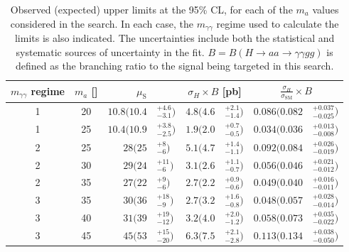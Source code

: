 \begin{table}[t]
  \begin{center}
    \caption{Observed (expected) upper limits at the 95\% CL, for each of the $m_a$ values considered in the search.
      In each case, the $m_{\gamma\gamma}$ regime used to calculate the limits is also indicated.
      The uncertainties include both the statistical and systematic sources of uncertainty in the fit.
      $B=B(H\to aa \to \gamma\gamma gg)$ is defined as the branching ratio to the signal being targeted in this search.
    }
    \label{tab:HBSM:limits}
          {\footnotesize
            \bgroup
            \def\arraystretch{1.5}
            \begin{tabular}{ccr@{}lr@{}lr@{}l}
	    \hline
            $m_{\gamma\gamma}$ regime & $m_a$ [\GeV{}] & \multicolumn{2}{c}{$\mu_\text{S}$}   & \multicolumn{2}{c}{\hspace{1.005cm}$\sigma_H\times B$ [pb]}  & \multicolumn{2}{c}{$\frac{\sigma_H}{\sigma_\text{SM}}\times B$} \\
	    \hline
            1 & 20 & $10.8\Big(10.4$&$^{+4.6}_{-3.1}\Big)$   & \hspace{1.1cm}$4.8\Big(4.6$&$^{+2.1}_{-1.4}\Big)$  & \hspace{0.505cm}$0.086\Big(0.082$&$^{+0.037}_{-0.025}\Big)$ \\
            1 & 25 & $10.4\Big(10.9$&$^{+3.8}_{-2.5}\Big)$   & $1.9\Big(2.0$&$^{+0.7}_{-0.5}\Big)$  & $0.034\Big(0.036$&$^{+0.013}_{-0.008}\Big)$ \\
            2 & 25 & $28\Big(25$&$^{+8}_{-6}\Big)$   & $5.1\Big(4.7$&$^{+1.4}_{-1.1}\Big)$  & $0.092\Big(0.084$&$^{+0.026}_{-0.019}\Big)$ \\
            2 & 30 & $29\Big(24$&$^{+11}_{-6}\Big)$  & $3.1\Big(2.6$&$^{+1.1}_{-0.7}\Big)$ & $0.056\Big(0.046$&$^{+0.021}_{-0.012}\Big)$ \\
            2 & 35 & $27\Big(22$&$^{+9}_{-6}\Big)$   & $2.7\Big(2.2$&$^{+0.9}_{-0.6}\Big)$ & $0.049\Big(0.040$&$^{+0.016}_{-0.011}\Big)$  \\
            3 & 35 & $30\Big(36$&$^{+18}_{-9}\Big)$  & $2.7\Big(3.2$&$^{+1.6}_{-0.8}\Big)$ & $0.048\Big(0.057$&$^{+0.028}_{-0.014}\Big)$  \\
            3 & 40 & $31\Big(39$&$^{+19}_{-12}\Big)$ & $3.2\Big(4.0$&$^{+2.0}_{-1.2}\Big)$  & $0.058\Big(0.073$&$^{+0.035}_{-0.022}\Big)$ \\
            3 & 45 & $45\Big(53$&$^{+15}_{-20}\Big)$ & $6.3\Big(7.5$&$^{+2.1}_{-2.8}\Big)$   & $0.113\Big(0.134$&$^{+0.038}_{-0.050}\Big)$     \\

\end{tabular}}
\end{center}
\end{table}
